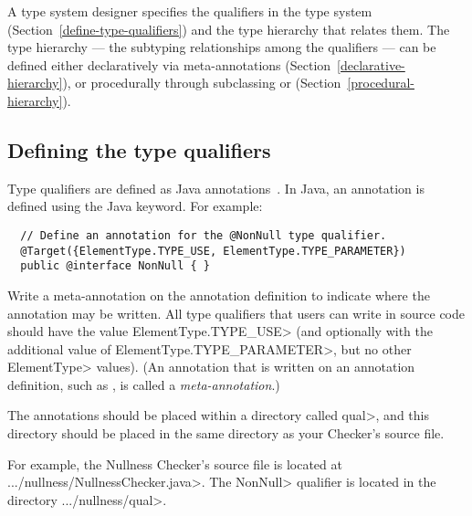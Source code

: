A type system designer specifies the qualifiers in the type system (Section~\ref{define-type-qualifiers})
and
the type hierarchy that relates them.
The type hierarchy --- the subtyping relationships among the qualifiers ---
can be defined either
declaratively via meta-annotations (Section~\ref{declarative-hierarchy}), or procedurally through
subclassing  or
 (Section~\ref{procedural-hierarchy}).


\subsection{Defining the type qualifiers\label{define-type-qualifiers}}


Type qualifiers are defined as Java annotations~\cite{JSR269}.  In Java, an
annotation is defined using the Java  keyword.
For example:

\begin{Verbatim}
  // Define an annotation for the @NonNull type qualifier.
  @Target({ElementType.TYPE_USE, ElementType.TYPE_PARAMETER})
  public @interface NonNull { }
\end{Verbatim}

\noindent

Write a 
meta-annotation on the annotation definition to indicate where the annotation
may be written. All type qualifiers that users can write in source code should
have the value \<ElementType.TYPE\_USE> (and optionally with the additional value of
\<ElementType.TYPE\_PARAMETER>, but no other \<ElementType> values).
(An annotation that is written on an annotation definition, such as
, is called a
\emph{meta-annotation}.)

The annotations should be placed within a directory called \<qual>, and this
directory should be placed in the same directory as your Checker's source file.

For example, the Nullness Checker's source file is located at
\<.../nullness/NullnessChecker.java>. The \<NonNull> qualifier is located in the
directory \<.../nullness/qual>.

